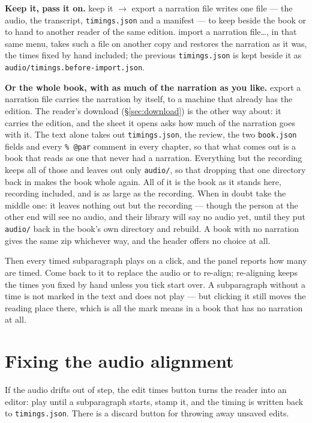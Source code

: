 \documentclass[11pt,oneside]{report}
\newcommand{\file}[1]{\texttt{#1}}
\newcommand{\menu}[1]{\textsf{#1}}
\begin{document}
\textbf{Keep it, pass it on.} \menu{keep it} $\rightarrow$ \menu{export a
narration file} writes one file --- the audio, the transcript,
\file{timings.json} and a manifest --- to keep beside the book or to hand to
another reader of the same edition. \menu{import a narration file\ldots}, in
that same menu, takes such a file on another copy and
restores the narration as it was, the times fixed by hand included; the
previous \file{timings.json} is kept beside it as
\file{audio/timings.before-import.json}.

\textbf{Or the whole book, with as much of the narration as you like.}
\menu{export a narration file} carries the narration by itself, to a machine
that already has the edition. The reader's \menu{download}
(\S\ref{sec:download}) is the other way about: it carries the edition, and
the sheet it opens asks how much of the narration goes with it.
\menu{The text alone} takes out \file{timings.json}, the review, the two
\file{book.json} fields and every \verb|% @par| comment in every chapter, so
that what comes out is a book that reads as one that never had a narration.
\menu{Everything but the recording} keeps all of those and leaves out only
\file{audio/}, so that dropping that one directory back in makes the book
whole again. \menu{All of it} is the book as it stands here, recording
included, and is as large as the recording. When in doubt take the middle
one: it leaves nothing out but the recording --- though the
person at the other end will see no audio, and their library will say
\menu{no audio yet}, until they put \file{audio/} back in the book's own
directory and rebuild. A book with no narration gives the same zip
whichever way, and the header offers no choice at all.

Then every timed subparagraph plays on a click, and the panel reports how
many are timed. Come back to it to replace the audio or to re-align;
re-aligning keeps the times you fixed by hand unless you tick \menu{start
over}. A subparagraph without a time is not marked in the text and does not
play --- but clicking it still moves the reading place there, which is all
the mark means in a book that has no narration at all.

\section{Fixing the audio alignment}
\label{sec:audiofix}

If the audio drifts out of step, the \menu{edit times}
button turns the reader into an editor: play until a subparagraph starts,
stamp it, and the timing is written back to \file{timings.json}. There is a
discard button for throwing away unsaved edits.
\end{document}
